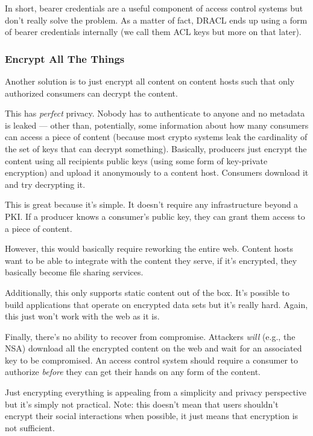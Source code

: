 \documentclass[pdftex,12pt,a4papaer,twoside,notitlepage]{report}
\begin{document}
In short, bearer credentials are a useful component of access control systems
but don't really solve the problem. As a matter of fact, DRACL ends up using a
form of bearer credentials internally (we call them ACL keys but more on that
later).

\subsubsection{Encrypt All The Things}

Another solution is to just encrypt all content on content hosts such that only
authorized consumers can decrypt the content.

This has \emph{perfect} privacy. Nobody has to authenticate to anyone and no
metadata is leaked --- other than, potentially, some information about how many
consumers can access a piece of content (because most crypto systems leak the
cardinality of the set of keys that can decrypt something). Basically, producers
just encrypt the content using all recipients public keys (using some form of
key-private encryption) and upload it anonymously to a content host. Consumers
download it and try decrypting it.

This is great because it's simple. It doesn't require any infrastructure beyond
a PKI. If a producer knows a consumer's public key, they can grant them access
to a piece of content.

However, this would basically require reworking the entire web. Content hosts
want to be able to integrate with the content they serve, if it's encrypted,
they basically become file sharing services.

Additionally, this only supports static content out of the box. It's possible to
build applications that operate on encrypted data sets but it's really hard.
Again, this just won't work with the web as it is.

Finally, there's no ability to recover from compromise. Attackers \emph{will}
(e.g., the NSA) download all the encrypted content on the web and wait for an
associated key to be compromised. An access control system should require a
consumer to authorize \emph{before} they can get their hands on any form of the
content.

Just encrypting everything is appealing from a simplicity and privacy
perspective but it's simply not practical. Note: this doesn't mean that users
shouldn't encrypt their social interactions when possible, it just means that
encryption is not sufficient.
\end{document}
